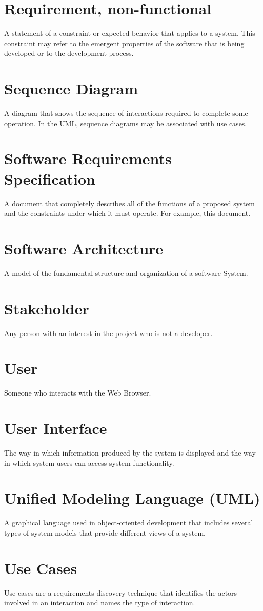 \documentclass{scrreprt}
\begin{document}
\section{Requirement, non-functional}
A statement of a constraint or expected behavior that applies to a
system. This constraint may refer to the emergent properties of the software that is being developed
or to the development process.
\section{Sequence Diagram}
A diagram that shows the sequence of interactions required to complete some
operation. In the UML, sequence diagrams may be associated with use cases.
\section{Software Requirements Specification}
A document that completely describes all of the functions
of a proposed system and the constraints under which it must operate. For example, this document.

\section{Software Architecture}
A model of the fundamental structure and organization of a software System.

\section{Stakeholder }
Any person with an interest in the project who is not a developer.
\section{User}
Someone who interacts with the Web Browser.
\section{User Interface}
The way in which information produced by the system is displayed and the way in which system users can access system functionality.
\section{Unified Modeling Language (UML)}
A graphical language used in object-oriented development
that includes several types of system models that provide different views of a system.
\section{Use Cases}
Use cases are a requirements discovery technique that identifies the actors involved in an
interaction and names the type of interaction.
\end{document}

